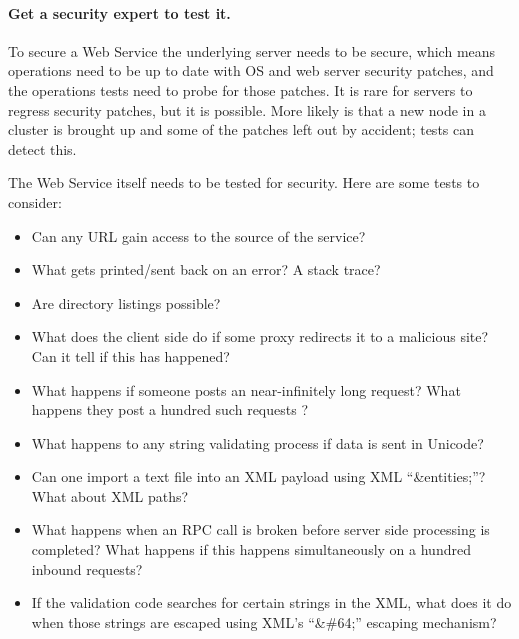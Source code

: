 \documentclass[draft]{report}
\begin{document}
\paragraph{Get a security expert to test it.}

To secure a Web Service the underlying server needs to be secure, which
means operations need to be up to date with OS and web server security
patches, and the operations tests need to probe for those patches. It is
rare for servers to regress security patches, but it is possible. More
likely is that a new node in a cluster is brought up and some of the
patches left out by accident; tests can detect this.

The Web Service itself needs to be tested for security. Here are some
tests to consider:

\begin{itemize}

\item Can any URL gain access to the source of the service?

\item What gets printed/sent back on an error? A stack trace?

\item Are directory listings possible?

\item What does the client side do if some proxy redirects it to a
malicious site? Can it tell if this has happened?

\item What happens if someone posts an near-infinitely long request?
What happens they post a hundred such requests ?

\item What happens to any string validating process if data is sent in
Unicode?

\item Can one import a text file into an XML payload using XML
``\&entities;''? What about XML paths?

\item What happens when an RPC call is broken before server side
processing is completed? What happens if this happens simultaneously on
a hundred inbound requests?

\item If the validation code searches for certain strings in the XML,
what does it do when those strings are escaped using XML's ``\&\#64;''
escaping mechanism?

\end{itemize}
\end{document}
